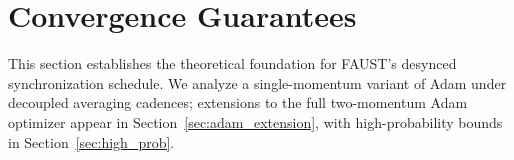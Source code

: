 \documentclass{article}
\begin{document}
\section{Convergence Guarantees}
\label{sec:convergence}

This section establishes the theoretical foundation for FAUST's desynced
synchronization schedule. We analyze a single-momentum variant of Adam under
decoupled averaging cadences; extensions to the full two-momentum Adam
optimizer appear in Section~\ref{sec:adam_extension}, with high-probability
bounds in Section~\ref{sec:high_prob}.

\end{document}

